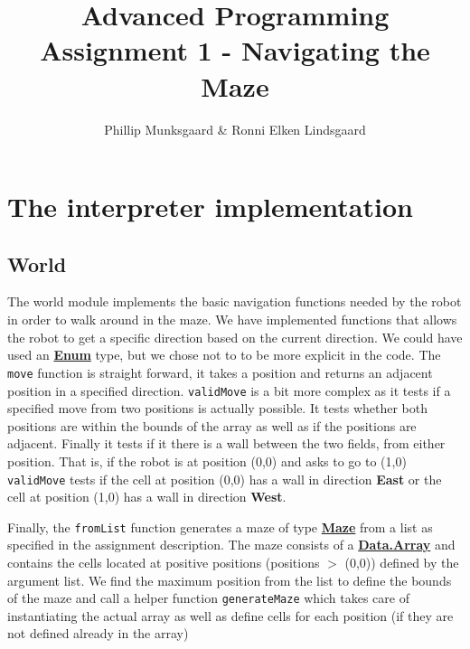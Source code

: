 \documentclass{article}
\title{Advanced Programming Assignment 1 - Navigating the Maze}
\author{Phillip Munksgaard \& Ronni Elken Lindsgaard}
\newcommand{\haskell}[1]{\texttt{#1}}
\newcommand{\datatype}[1]{\underline{\textbf{#1}}}
\newcommand{\direction}[1]{\textbf{#1}}
\begin{document}
\maketitle
\section{The interpreter implementation}
\subsection{World}
The world module implements the basic navigation functions needed by the robot in order to walk around in the maze. 
We have implemented functions that allows the robot to get a specific direction based on the current direction. 
We could have used an \datatype{Enum} type, but we chose not to to be more explicit in the code.
The \haskell{move} function is straight forward, it takes a position and returns an adjacent position in a specified direction.
\haskell{validMove} is a bit more complex as it tests if a specified move from two positions is actually possible. 
It tests whether both positions are within the bounds of the array as well as if the positions are adjacent. 
Finally it tests if it there is a wall between the two fields, from either position. 
That is, if the robot is at position (0,0) and asks to go to (1,0) \haskell{validMove} tests if the cell at position (0,0) has a wall in direction \direction{East} or the cell at position (1,0) has a wall in direction \direction{West}.

Finally, the \haskell{fromList} function generates a maze of type \datatype{Maze} from a list as specified in the assignment description.
The maze consists of a \datatype{Data.Array} and contains the cells located at positive positions (positions $>$ (0,0)) defined by the argument list. We find the maximum position from the list to define the bounds of the maze and call a helper function \haskell{generateMaze} which takes care of instantiating the actual array as well as define cells for each position (if they are not defined already in the array)
\end{document}
